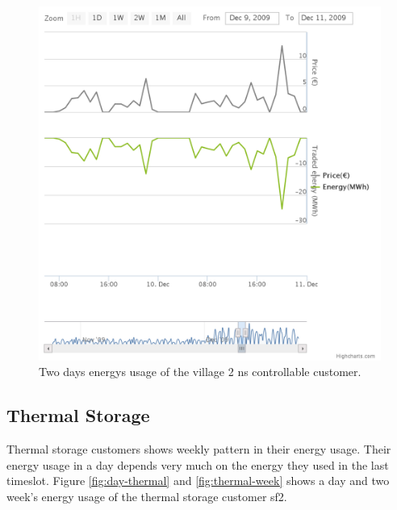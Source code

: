 \begin{figure}[h!]
  \includegraphics[width=\linewidth]{village2nsControllable.png}
  \caption{Two days energys usage of the village 2 ns controllable customer.}
  \label{fig:2weekOffice}
\end{figure}

\subsection{Thermal Storage}
Thermal storage customers shows weekly pattern in their energy usage. Their energy usage in a day depends very much on the energy they used in the last timeslot. Figure \ref{fig:day-thermal} and \ref{fig:thermal-week} shows a day and two week's energy usage of the thermal storage customer sf2.

